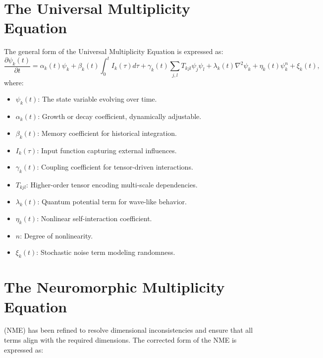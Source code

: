 \documentclass{article}
\theoremstyle{plain}
\begin{document}
\section{The Universal Multiplicity Equation}
The general form of the Universal Multiplicity Equation is expressed as:
\begin{equation}
\frac{\partial \psi_k(t)}{\partial t} = \alpha_k(t)\psi_k + \beta_k(t) \int_0^t I_k(\tau) d\tau + \gamma_k(t) \sum_{j,l} T_{kjl} \psi_j \psi_l + \lambda_k(t) \nabla^2 \psi_k + \eta_k(t) \psi_k^n + \xi_k(t),
\end{equation}
where:
\begin{itemize}
    \item $\psi_k(t)$: The state variable evolving over time.
    \item $\alpha_k(t)$: Growth or decay coefficient, dynamically adjustable.
    \item $\beta_k(t)$: Memory coefficient for historical integration.
    \item $I_k(\tau)$: Input function capturing external influences.
    \item $\gamma_k(t)$: Coupling coefficient for tensor-driven interactions.
    \item $T_{kjl}$: Higher-order tensor encoding multi-scale dependencies.
    \item $\lambda_k(t)$: Quantum potential term for wave-like behavior.
    \item $\eta_k(t)$: Nonlinear self-interaction coefficient.
    \item $n$: Degree of nonlinearity.
    \item $\xi_k(t)$: Stochastic noise term modeling randomness.
\end{itemize}

\section{The Neuromorphic Multiplicity Equation}(NME) has been refined to resolve dimensional inconsistencies and ensure that all terms align with the required dimensions. The corrected form of the NME is expressed as:
\end{document}
